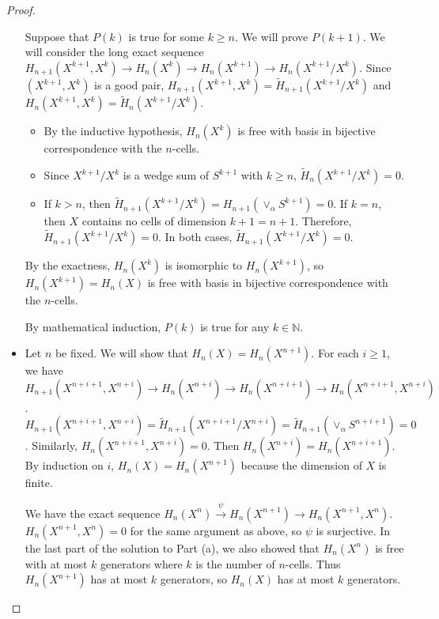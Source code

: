 \documentclass[psamsfonts]{amsart}
\theoremstyle{definition}
\theoremstyle{remark}
\numberwithin{equation}{section}
\begin{document}
\begin{proof}
\begin{itemize}
      Suppose that $P(k)$ is true for some $k \geq n$.
      We will prove $P(k + 1)$.
      We will consider the long exact sequence $H_{n + 1}(X^{k + 1}, X^k) \rightarrow H_n(X^k) \rightarrow H_n(X^{k + 1}) \rightarrow H_n(X^{k + 1} / X^k)$.
      Since $(X^{k + 1}, X^k)$ is a good pair, $H_{n + 1}(X^{k + 1}, X^k) = \tilde{H}_{n + 1}(X^{k + 1} / X^k)$ and $H_{n}(X^{k + 1}, X^k) = \tilde{H}_{n}(X^{k + 1} / X^k)$.
      \begin{itemize}
        \item
          By the inductive hypothesis, $H_n(X^k)$ is free with basis in bijective correspondence with the $n$-cells.
        \item
          Since $X^{k + 1} / X^k$ is a wedge sum of $S^{k + 1}$ with $k \geq n$, $\tilde{H}_n(X^{k + 1} / X^k) = 0$.
        \item
          If $k > n$, then $\tilde{H}_{n + 1}(X^{k + 1} / X^k) = H_{n + 1}(\vee_{\alpha} S^{k + 1}) = 0$.
          If $k = n$, then $X$ contains no cells of dimension $k + 1 = n + 1$.
          Therefore, $\tilde{H}_{n + 1}(X^{k + 1} / X^k) = 0$.
          In both cases, $\tilde{H}_{n + 1}(X^{k + 1} / X^k) = 0$.
      \end{itemize}
      By the exactness, $H_n(X^k)$ is isomorphic to $H_n(X^{k + 1})$, so $H_n(X^{k + 1}) = H_n(X)$ is free with basis in bijective correspondence with the $n$-cells.

      By mathematical induction, $P(k)$ is true for any $k \in \mathbb{N}$.
    \item
      Let $n$ be fixed.
      We will show that $H_n(X) = H_n(X^{n + 1})$.
      For each $i \geq 1$, we have $H_{n + 1}(X^{n + i + 1}, X^{n + i}) \rightarrow H_{n}(X^{n + i}) \rightarrow H_{n}(X^{n + i + 1}) \rightarrow H_n(X^{n + i + 1}, X^{n + i})$.
      $H_{n + 1}(X^{n + i + 1}, X^{n + i}) = \tilde{H}_{n + 1}(X^{n + i + 1} / X^{n + i}) = \tilde{H}_{n + 1}(\vee_{\alpha} S^{n + i + 1}) = 0$.
      Similarly, $H_n(X^{n + i + 1}, X^{n + i}) = 0$.
      Then $H_{n}(X^{n + i}) = H_n(X^{n + i + 1})$.
      By induction on $i$, $H_n(X) = H_n(X^{n + 1})$ because the dimension of $X$ is finite.

      We have the exact sequence $H_n(X^n) \xrightarrow{\psi} H_n(X^{n + 1}) \rightarrow H_n(X^{n + 1}, X^n)$.
      $H_n(X^{n + 1}, X^n) = 0$ for the same argument as above, so $\psi$ is surjective.
      In the last part of the solution to Part (a), we also showed that $H_n(X^n)$ is free with at most $k$ generators where $k$ is the number of $n$-cells.
      Thus $H_n(X^{n + 1})$ has at most $k$ generators, so $H_n(X)$ has at most $k$ generators.
  \end{itemize}
\end{proof}
\end{document}
